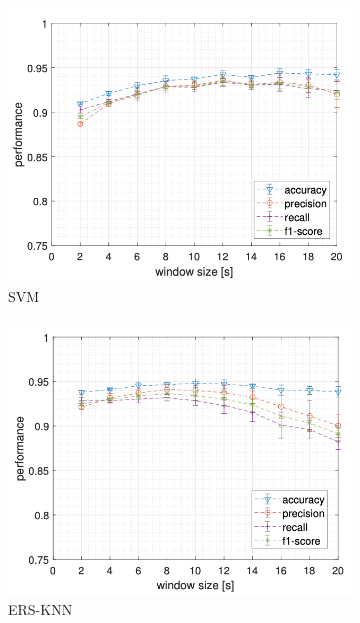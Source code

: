 \begin{figure}[!htb]
    \centering
    \begin{subfigure}{.45\textwidth}
        \includegraphics[width=\textwidth]{figure/svm_window.png}
        \caption{SVM}
        \label{fig:window:svm}
    \end{subfigure}
    \begin{subfigure}{.45\textwidth}
        \includegraphics[width=\textwidth]{figure/knn_window.png}
        \caption{ERS-KNN}
        \label{fig:window:knn}
    \end{subfigure}
    \begin{subfigure}{.45\textwidth}

\end{subfigure}
\end{figure}

